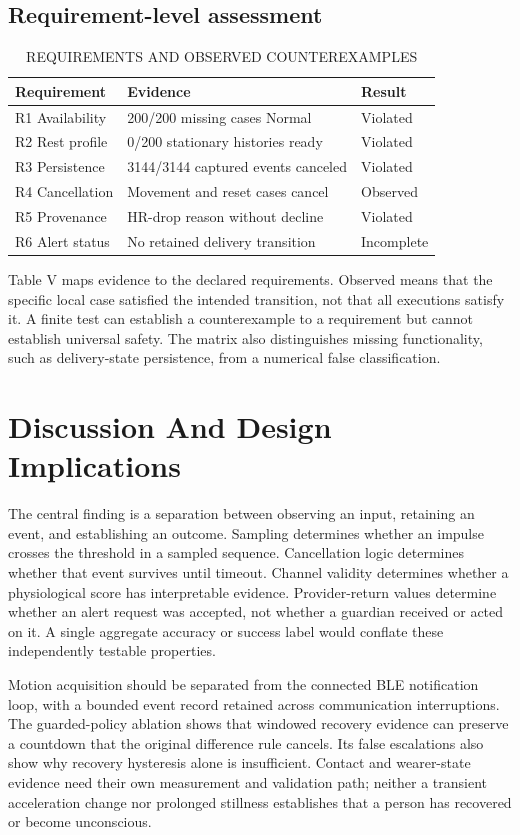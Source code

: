\documentclass[journal]{IEEEtran}
\begin{document}
\subsection{Requirement-level assessment}
\begin{table}[!t]\caption{REQUIREMENTS AND OBSERVED COUNTEREXAMPLES}\centering\scriptsize\setlength{\tabcolsep}{2pt}
\begin{tabular}{p{}p{}p{}}\hline
Requirement & Evidence & Result\\\hline
R1 Availability & 200/200 missing cases Normal & Violated\\
R2 Rest profile & 0/200 stationary histories ready & Violated\\
R3 Persistence & 3144/3144 captured events canceled & Violated\\
R4 Cancellation & Movement and reset cases cancel & Observed\\
R5 Provenance & HR-drop reason without decline & Violated\\
R6 Alert status & No retained delivery transition & Incomplete\\
\hline\end{tabular}\end{table}
Table V maps evidence to the declared requirements. Observed means that the specific local case satisfied the intended transition, not that all executions satisfy it. A finite test can establish a counterexample to a requirement but cannot establish universal safety. The matrix also distinguishes missing functionality, such as delivery-state persistence, from a numerical false classification.

\section{Discussion And Design Implications}
The central finding is a separation between observing an input, retaining an event, and establishing an outcome. Sampling determines whether an impulse crosses the threshold in a sampled sequence. Cancellation logic determines whether that event survives until timeout. Channel validity determines whether a physiological score has interpretable evidence. Provider-return values determine whether an alert request was accepted, not whether a guardian received or acted on it. A single aggregate accuracy or success label would conflate these independently testable properties.

Motion acquisition should be separated from the connected BLE notification loop, with a bounded event record retained across communication interruptions. The guarded-policy ablation shows that windowed recovery evidence can preserve a countdown that the original difference rule cancels. Its false escalations also show why recovery hysteresis alone is insufficient. Contact and wearer-state evidence need their own measurement and validation path; neither a transient acceleration change nor prolonged stillness establishes that a person has recovered or become unconscious.
\end{document}
